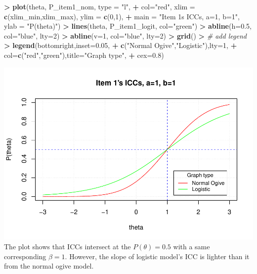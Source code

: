 \documentclass[
]{article}
\newenvironment{Shaded}{\begin{snugshade}}{\end{snugshade}}
\newcommand{\AttributeTok}[1]{\textcolor[rgb]{0.13,0.29,0.53}{#1}}
\newcommand{\CommentTok}[1]{\textcolor[rgb]{0.56,0.35,0.01}{\textit{#1}}}
\newcommand{\DecValTok}[1]{\textcolor[rgb]{0.00,0.00,0.81}{#1}}
\newcommand{\ErrorTok}[1]{\textcolor[rgb]{0.64,0.00,0.00}{\textbf{#1}}}
\newcommand{\FloatTok}[1]{\textcolor[rgb]{0.00,0.00,0.81}{#1}}
\newcommand{\FunctionTok}[1]{\textcolor[rgb]{0.13,0.29,0.53}{\textbf{#1}}}
\newcommand{\NormalTok}[1]{#1}
\newcommand{\SpecialCharTok}[1]{\textcolor[rgb]{0.81,0.36,0.00}{\textbf{#1}}}
\newcommand{\StringTok}[1]{\textcolor[rgb]{0.31,0.60,0.02}{#1}}
\begin{document}
\begin{Shaded}
\begin{Highlighting}[]
\SpecialCharTok{\textgreater{}} \FunctionTok{plot}\NormalTok{(theta, P\_item1\_nom, }\AttributeTok{type =} \StringTok{"l"}\NormalTok{, }
\SpecialCharTok{+}      \AttributeTok{col=}\StringTok{"red"}\NormalTok{, }\AttributeTok{xlim =} \FunctionTok{c}\NormalTok{(xlim\_min,xlim\_max), }\AttributeTok{ylim =} \FunctionTok{c}\NormalTok{(}\DecValTok{0}\NormalTok{,}\DecValTok{1}\NormalTok{),}
\SpecialCharTok{+}      \AttributeTok{main =} \StringTok{"Item 1\textquotesingle{}s ICCs, a=1, b=1"}\NormalTok{, }\AttributeTok{ylab =} \StringTok{"P(theta)"}\NormalTok{)}
\SpecialCharTok{\textgreater{}} \FunctionTok{lines}\NormalTok{(theta, P\_item1\_logit, }\AttributeTok{col=}\StringTok{"green"}\NormalTok{)}
\SpecialCharTok{\textgreater{}} \FunctionTok{abline}\NormalTok{(}\AttributeTok{h=}\FloatTok{0.5}\NormalTok{, }\AttributeTok{col=}\StringTok{"blue"}\NormalTok{, }\AttributeTok{lty=}\DecValTok{2}\NormalTok{)}
\SpecialCharTok{\textgreater{}} \FunctionTok{abline}\NormalTok{(}\AttributeTok{v=}\DecValTok{1}\NormalTok{, }\AttributeTok{col=}\StringTok{"blue"}\NormalTok{, }\AttributeTok{lty=}\DecValTok{2}\NormalTok{)}
\SpecialCharTok{\textgreater{}} \FunctionTok{grid}\NormalTok{()}
\SpecialCharTok{\textgreater{}} \CommentTok{\# add legend}
\ErrorTok{\textgreater{}} \FunctionTok{legend}\NormalTok{(}\StringTok{\textquotesingle{}bottomright\textquotesingle{}}\NormalTok{,}\AttributeTok{inset=}\FloatTok{0.05}\NormalTok{,}
\SpecialCharTok{+}        \FunctionTok{c}\NormalTok{(}\StringTok{"Normal Ogive"}\NormalTok{,}\StringTok{"Logistic"}\NormalTok{),}\AttributeTok{lty=}\DecValTok{1}\NormalTok{,}
\SpecialCharTok{+}        \AttributeTok{col=}\FunctionTok{c}\NormalTok{(}\StringTok{"red"}\NormalTok{,}\StringTok{"green"}\NormalTok{),}\AttributeTok{title=}\StringTok{"Graph type"}\NormalTok{,}
\SpecialCharTok{+}        \AttributeTok{cex=}\FloatTok{0.8}\NormalTok{)}
\end{Highlighting}
\end{Shaded}

\includegraphics{Assignment_1_files/figure-latex/unnamed-chunk-7-1.pdf}
The plot shows that ICCs intersect at the \(P(\theta) = 0.5\) with a
same corresponding \(\beta = 1\). However, the slope of logistic model's
ICC is lighter than it from the normal ogive model.
\end{document}
